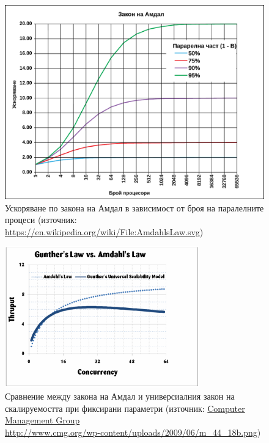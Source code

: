 \begin{figure}
  \includegraphics[width=\textwidth]{images/amdahls-law.pdf}
  \caption[Ускоряване по закона на Амдал в зависимост от броя на паралелните процеси]{Ускоряване по закона на Амдал в зависимост от броя на паралелните процеси (източник: \footnotesize\url{https://en.wikipedia.org/wiki/File:AmdahlsLaw.svg})}
  \label{fig:amdahls-law}
\end{figure}

\begin{figure}
  \centering\includegraphics[width=0.75\textwidth]{images/gunthers-amdahls-laws.png}
  \caption[Сравнение между закона на Амдал и и универсиалния закон на скалируемостта при фиксирани параметри]{Сравнение между закона на Амдал и универсиалния закон на скалируемостта при фиксирани параметри (източник: \href{http://www.cmg.org/publications/measureit/2007-2/mit44/measureit-issue-5-09-a-review-of-beginning-excel-what-if-data-analysis-tools-getting-started-with-goal-seek-data-tables-scenarios-and-solver-by-michael-s-hines/}{Computer Management Group\\
      http://www.cmg.org/wp-content/uploads/2009/06/m\_44\_18b.png})}
  \label{fig:gunthers-law}
\end{figure}

